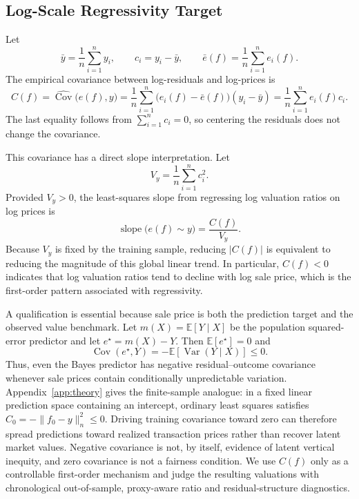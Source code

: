 \documentclass[10pt]{article}
\theoremstyle{definition}
\newcommand{\E}{\mathbb{E}}
\newcommand{\Cov}{\operatorname{Cov}}
\newcommand{\Var}{\operatorname{Var}}
\newcommand{\1}{\mathbf{1}}
\begin{document}
\subsection{{Log-Scale Regressivity Target}}
\label{subsec:training_regressivity}

Let
\begin{equation}
\label{eq:centered_log_price}
\bar y=\frac{1}{n}\sum_{i=1}^n y_i,
\qquad
c_i=y_i-\bar y,
\qquad
\bar e(f)=\frac{1}{n}\sum_{i=1}^n e_i(f).
\end{equation}
The empirical covariance between log-residuals and log-prices is
\begin{equation}
\label{eq:training_covariance}
C(f)
=
\widehat{\operatorname{Cov}}\bigl(e(f),y\bigr)
=
\frac{1}{n}\sum_{i=1}^n
\bigl(e_i(f)-\bar e(f)\bigr)(y_i-\bar y)
=
\frac{1}{n}\sum_{i=1}^n e_i(f)c_i.
\end{equation}
The last equality follows from $\sum_{i=1}^n c_i=0$, so centering the residuals does not change the covariance.

This covariance has a direct slope interpretation. Let
\[
V_y=\frac{1}{n}\sum_{i=1}^n c_i^2.
\]
Provided $V_y>0$, the least-squares slope from regressing log valuation ratios on log prices is
\begin{equation}
\label{eq:covariance_slope}
\operatorname{slope}\bigl(e(f)\sim y\bigr)
=
\frac{C(f)}{V_y}.
\end{equation}
Because $V_y$ is fixed by the training sample, reducing $|C(f)|$ is equivalent to reducing the magnitude of this global linear trend. In particular, $C(f)<0$ indicates that log valuation ratios tend to decline with log sale price, which is the first-order pattern associated with regressivity.


A qualification is essential because sale price is both the prediction target and the observed value benchmark. Let $m(X)=\E[Y\mid X]$ be the population squared-error predictor and let $e^\star=m(X)-Y$. Then $\E[e^\star]=0$ and
\begin{equation}
\label{eq:bayes_residual_covariance}
\Cov(e^\star,Y)=-\E\!\left[\Var(Y\mid X)\right]\leq0.
\end{equation}
Thus, even the Bayes predictor has negative residual--outcome covariance whenever sale prices contain conditionally unpredictable variation. Appendix~\ref{app:theory} gives the finite-sample analogue: in a fixed linear prediction space containing an intercept, ordinary least squares satisfies $C_0=-\lVert f_0-y\rVert_n^2\leq0$. Driving training covariance toward zero can therefore spread predictions toward realized transaction prices rather than recover latent market values. Negative covariance is not, by itself, evidence of latent vertical inequity, and zero covariance is not a fairness condition. We use $C(f)$ only as a controllable first-order mechanism and judge the resulting valuations with chronological out-of-sample, proxy-aware ratio and residual-structure diagnostics.
\end{document}
